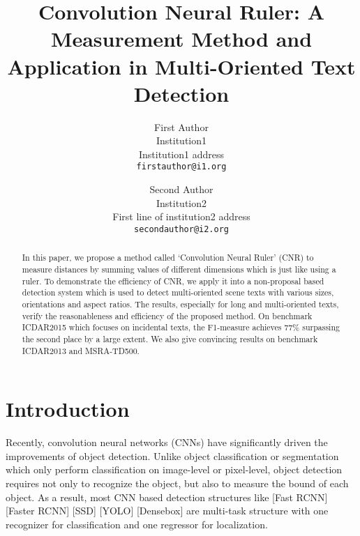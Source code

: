 \documentclass[10pt,twocolumn,letterpaper]{article}
\begin{document}
\title{Convolution Neural Ruler: A Measurement Method and Application in Multi-Oriented Text Detection}

\author{First Author\\
Institution1\\
Institution1 address\\
{\tt\small firstauthor@i1.org}
\and
Second Author\\
Institution2\\
First line of institution2 address\\
{\tt\small secondauthor@i2.org}
}

\maketitle

\begin{abstract}
   In this paper, we propose a method called ‘Convolution Neural Ruler’ (CNR) to measure distances by summing values of different dimensions which is just like using a ruler. To demonstrate the efficiency of CNR, we apply it into a non-proposal based detection system which is used to detect multi-oriented scene texts with various sizes, orientations and aspect ratios. The results, especially for long and multi-oriented texts, verify the reasonableness and efficiency of the proposed method. On benchmark ICDAR2015 which focuses on incidental texts, the F1-measure achieves 77\% surpassing the second place by a large extent. We also give convincing results on benchmark ICDAR2013 and MSRA-TD500.
\end{abstract}

\section{Introduction}

Recently, convolution neural networks (CNNs) have significantly driven the improvements of object detection. Unlike object classification or segmentation which only perform classification on image-level or pixel-level, object detection requires not only to recognize the object, but also to measure the bound of each object. As a result, most CNN based detection structures like [Fast RCNN] [Faster RCNN] [SSD] [YOLO] [Densebox] are multi-task structure with one recognizer for classification and one regressor for localization.
\end{document}
